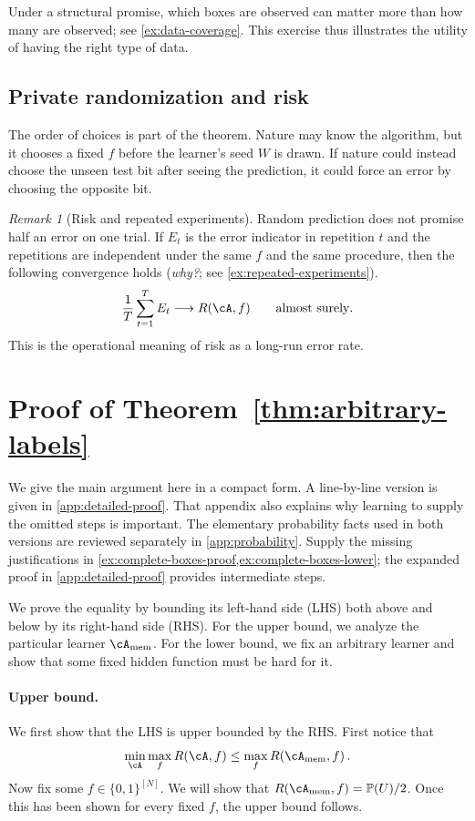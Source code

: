 \documentclass[11pt,twoside]{article}
\renewcommand{\P}{\mathbb P}
\newcommand{\cAmem}{\cA_{\mathrm{mem}}}
\theoremstyle{definition}
\theoremstyle{remark}
\newtheorem{remark}[theorem]{Remark}
\begin{document}
Under a structural promise, which boxes are observed can matter more than
how many are observed; see \cref{ex:data-coverage}. This exercise thus illustrates
the utility of having the right type of data.

\subsection{Private randomization and risk}

The order of choices is part of the theorem. Nature may know the algorithm,
but it chooses a fixed $f$ before the learner's seed $W$ is drawn. If nature
could instead choose the unseen test bit after seeing the prediction, it
could force an error by choosing the opposite bit.

\begin{remark}[Risk and repeated experiments]
\label{rem:risk-repetitions}
Random prediction does not promise half an error on one trial. If $E_t$ is the
error indicator in repetition $t$ and the repetitions are independent under
the same $f$ and the same procedure, then the following convergence holds
(\emph{why?}; see \cref{ex:repeated-experiments}).
\[
\frac1T\sum_{t=1}^T E_t \longrightarrow R(\cA,f)
\qquad\text{almost surely}.
\]
This is the operational meaning of risk as a long-run error rate.
\end{remark}

\section{Proof of Theorem~\ref{thm:arbitrary-labels}}
\label{sec:proof}

We give the main argument here in a compact form. A line-by-line version is
given in \cref{app:detailed-proof}. That appendix also explains why
learning to supply the omitted steps is important. The elementary probability
facts used in both versions are reviewed separately in
\cref{app:probability}. Supply the missing justifications in
\cref{ex:complete-boxes-proof,ex:complete-boxes-lower}; the expanded proof in
\cref{app:detailed-proof} provides intermediate steps.

We prove the equality by bounding its left-hand side (LHS) both above and
below by its right-hand side (RHS).
For the upper bound, we analyze the particular learner $\cAmem$. For the lower
bound, we fix an arbitrary learner and show that some fixed hidden function
must be hard for it.

\paragraph{Upper bound.}
We first show that the LHS is upper bounded by the RHS. First notice that
\[
\min_{\cA}\max_f R(\cA,f)
\le \max_f R(\cAmem,f)\,.
\]
Now fix some $f\in\{0,1\}^{[N]}$. We will show that
$R(\cAmem,f)=\P(U)/2$. Once this has been shown for every fixed $f$, the upper
bound follows.
\end{document}
